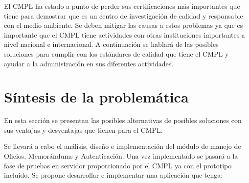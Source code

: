 El CMPL ha estado a punto de perder sus certificaciones más importantes que tiene para demostrar que es un centro de investigación de calidad y responsable con el medio ambiente. Se deben mitigar las causas a estos problemas ya que es importante que el CMPL tiene actividades con otras instituciones importantes a nivel nacional e internacional. A continuación se hablará de las posibles soluciones para cumplir con los estándares de calidad que tiene el CMPL y ayudar a la administración en sus diferentes actividades. 

\section{Síntesis de la problemática}

En esta sección se presentan las posibles alternativas de posibles soluciones con sus ventajas y desventajas que tienen para el CMPL.



Se llevará a cabo el análisis, diseño e implementación del módulo de manejo de Oficios, Memorándums y Autenticación. Una vez implementado se pasará a la fase de pruebas en servidor proporcionado por el CMPL ya con el prototipo incluido. Se propone desarrollar e implementar una aplicación que tenga:\\
	
